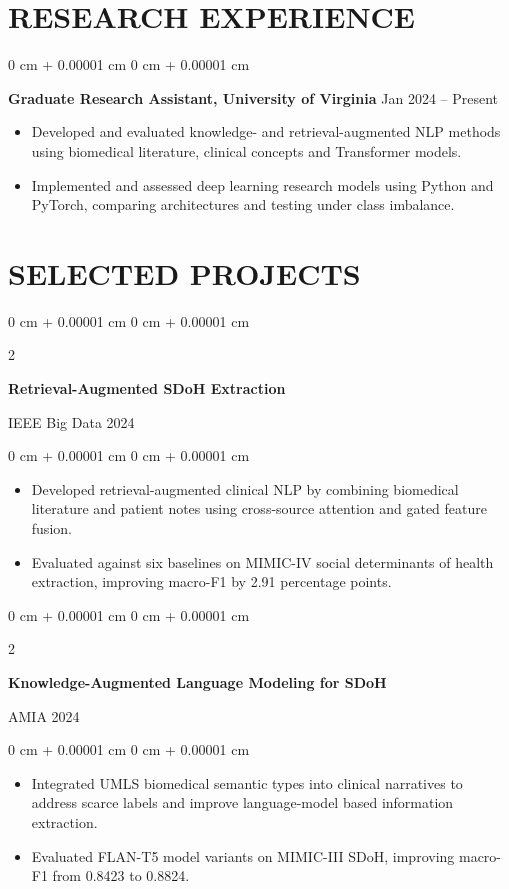 \documentclass[10pt, letterpaper]{article}
\newenvironment{highlights}{
    \begin{itemize}[
        topsep=0.03 cm,
        parsep=0.03 cm,
        partopsep=0pt,
        itemsep=0pt,
        leftmargin=0 cm + 10pt
    ]
}{
    \end{itemize}
} %
\newenvironment{onecolentry}{
    \begin{adjustwidth}{
        0 cm + 0.00001 cm
    }{
        0 cm + 0.00001 cm
    }
}{
    \end{adjustwidth}
} %
\newenvironment{twocolentry}[2][]{
    \onecolentry
    \def\secondColumn{#2}
    \setcolumnwidth{\fill, 4.5 cm}
    \begin{paracol}{2}
}{
    \switchcolumn \raggedleft \secondColumn
    \end{paracol}
    \endonecolentry
} %
\begin{document}
\section{RESEARCH EXPERIENCE}
\begin{onecolentry}
\textbf{Graduate Research Assistant, University of Virginia} \hfill Jan 2024 -- Present
\begin{highlights}
\item Developed and evaluated knowledge- and retrieval-augmented NLP methods using biomedical literature, clinical concepts and Transformer models.
\item Implemented and assessed deep learning research models using Python and PyTorch, comparing architectures and testing under class imbalance.
\end{highlights}
\end{onecolentry}
\section{SELECTED PROJECTS}
\begin{twocolentry}{IEEE Big Data 2024}
\textbf{Retrieval-Augmented SDoH Extraction}
\end{twocolentry}
\begin{onecolentry}
\begin{highlights}
\item Developed retrieval-augmented clinical NLP by combining biomedical literature and patient notes using cross-source attention and gated feature fusion.
\item Evaluated against six baselines on MIMIC-IV social determinants of health extraction, improving macro-F1 by 2.91 percentage points.
\end{highlights}
\end{onecolentry}
\vspace{0.035 cm}

\begin{twocolentry}{AMIA 2024}
\textbf{Knowledge-Augmented Language Modeling for SDoH}
\end{twocolentry}
\begin{onecolentry}
\begin{highlights}
\item Integrated UMLS biomedical semantic types into clinical narratives to address scarce labels and improve language-model based information extraction.
\item Evaluated FLAN-T5 model variants on MIMIC-III SDoH, improving macro-F1 from 0.8423 to 0.8824.
\end{highlights}
\end{onecolentry}
\vspace{0.035 cm}
\end{document}

